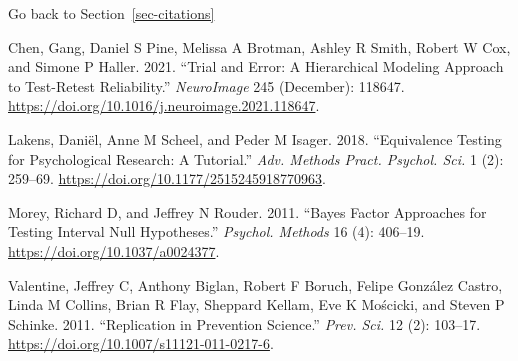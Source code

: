 \documentclass[
  letterpaper,
  DIV=11,
  numbers=noendperiod]{scrartcl}
\newlength{\cslhangindent}
\newlength{\cslentryspacingunit} %
\newenvironment{CSLReferences}[2] %
 {%
  \setlength{\parindent}{0pt}
  \ifodd #1
  \let\oldpar\par
  \def\par{\hangindent=\cslhangindent\oldpar}
  \fi
  \setlength{\parskip}{#2\cslentryspacingunit}
 }%
 {}
\begin{document}
Go back to Section~\ref{sec-citations}

\hypertarget{refs}{}
\begin{CSLReferences}{1}{0}
\leavevmode{}%
Chen, Gang, Daniel S Pine, Melissa A Brotman, Ashley R Smith, Robert W
Cox, and Simone P Haller. 2021. {``Trial and Error: A Hierarchical
Modeling Approach to Test-Retest Reliability.''} \emph{NeuroImage} 245
(December): 118647.
\url{https://doi.org/10.1016/j.neuroimage.2021.118647}.

\leavevmode{}%
Lakens, Daniël, Anne M Scheel, and Peder M Isager. 2018. {``Equivalence
Testing for Psychological Research: A Tutorial.''} \emph{Adv. Methods
Pract. Psychol. Sci.} 1 (2): 259--69.
\url{https://doi.org/10.1177/2515245918770963}.

\leavevmode{}%
Morey, Richard D, and Jeffrey N Rouder. 2011. {``Bayes Factor Approaches
for Testing Interval Null Hypotheses.''} \emph{Psychol. Methods} 16 (4):
406--19. \url{https://doi.org/10.1037/a0024377}.

\leavevmode{}%
Valentine, Jeffrey C, Anthony Biglan, Robert F Boruch, Felipe González
Castro, Linda M Collins, Brian R Flay, Sheppard Kellam, Eve K Mościcki,
and Steven P Schinke. 2011. {``Replication in Prevention Science.''}
\emph{Prev. Sci.} 12 (2): 103--17.
\url{https://doi.org/10.1007/s11121-011-0217-6}.

\end{CSLReferences}
\end{document}
